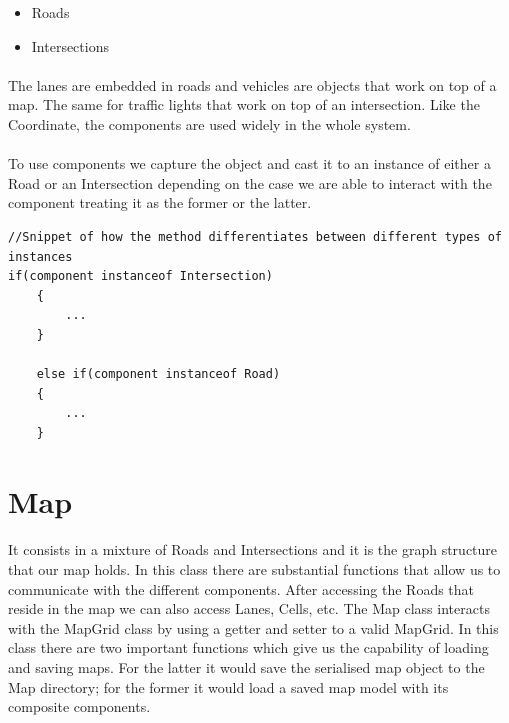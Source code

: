\documentclass[a4paper]{article}
\begin{document}
\begin{itemize}  
\item Roads
\item Intersections
\end{itemize}

\paragraph{}
The lanes are embedded in roads and vehicles are objects that work on top of a map. The same for traffic lights that work on top of an intersection. Like the Coordinate, the components are used widely in the whole system.

\paragraph{}
To use components we capture the object and cast it to an instance of either a Road or an Intersection depending on the case we are able to interact with the component treating it as the former or the latter.

\begin{lstlisting}
//Snippet of how the method differentiates between different types of instances
if(component instanceof Intersection) 
    {
    	...
    }
    
    else if(component instanceof Road) 
    {
    	...        
    }
\end{lstlisting}

\section{Map}
\paragraph{}
It consists in a mixture of Roads and Intersections and it is the graph structure that our map holds. In this class there are substantial functions that allow us to communicate with the different components.  After accessing the Roads that reside in the map we can also access Lanes, Cells, etc. The Map class interacts with the MapGrid class by using a getter and setter to a valid MapGrid. In this class there are two important functions which give us the capability of loading and saving maps. For the latter it would save the serialised map object to the Map directory; for the former it would load a saved map model with its composite components.
\end{document}
